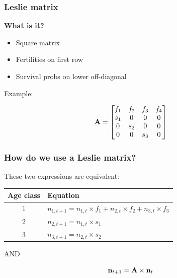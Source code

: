 \documentclass[color=usenames,dvipsnames]{beamer}\usepackage[]{graphicx}\usepackage[]{color}
\begin{document}
\begin{frame}
  \frametitle{Leslie matrix}
  \large
  {\bf What is it?}
  \begin{itemize}
    \item Square matrix %
    \item Fertilities on first row
    \item Survival probs on lower off-diagonal
  \end{itemize}
  \pause
  \vspace{.8cm}
  Example:
  \large
  \begin{center}
    \[
    {\bf A} =
    \begin{bmatrix}
      f_1 & f_2 & f_3 & f_4 \\
      s_1 & 0 & 0 & 0 \\
      0 & s_2 & 0 & 0 \\
      0 & 0 & s_3 & 0
    \end{bmatrix}
    \]
  \end{center}
\end{frame}











\begin{frame}
  \frametitle{How do we use a Leslie matrix?}
  \large
  These two expressions are equivalent: \par
  \vspace{0.5cm}
  \begin{tabular}{cl}
    \hline
    Age class & Equation \\
    \hline
    1 & $n_{1,t+1} = n_{1,t} \times f_{1} + n_{2,t} \times f_{2} + n_{3,t} \times f_3$ \\
    2 & $n_{2,t+1} = n_{1,t} \times s_{1}$ \\
    3 & $n_{3,t+1} = n_{2,t} \times s_{2}$ \\
    \hline
  \end{tabular}
  \vfill
  {\centering AND \par}
  \vfill
  \[
    {\bf n}_{t+1} = {\bf A}\times {\bf n}_{t}
  \]
\end{frame}
\end{document}
